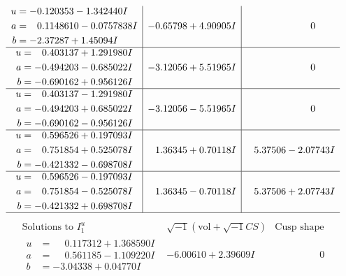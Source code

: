 \documentclass[1p]{elsarticle_modified}
\theoremstyle{definition}
\newcommand{\I}{\sqrt{-1}}
\begin{document}
$$\begin{array}{c|c|c}
\begin{aligned}
u &= -0.120353 - 1.342440 I \\
a &= \phantom{-}0.1148610 - 0.0757838 I \\
b &= -2.37287 + 1.45094 I\end{aligned}
 & -0.65798 + 4.90905 I & \phantom{-0.000000 } 0 \\ \hline\begin{aligned}
u &= \phantom{-}0.403137 + 1.291980 I \\
a &= -0.494203 - 0.685022 I \\
b &= -0.690162 + 0.956126 I\end{aligned}
 & -3.12056 + 5.51965 I & \phantom{-0.000000 } 0 \\ \hline\begin{aligned}
u &= \phantom{-}0.403137 - 1.291980 I \\
a &= -0.494203 + 0.685022 I \\
b &= -0.690162 - 0.956126 I\end{aligned}
 & -3.12056 - 5.51965 I & \phantom{-0.000000 } 0 \\ \hline\begin{aligned}
u &= \phantom{-}0.596526 + 0.197093 I \\
a &= \phantom{-}0.751854 + 0.525078 I \\
b &= -0.421332 - 0.698708 I\end{aligned}
 & \phantom{-}1.36345 + 0.70118 I & \phantom{-}5.37506 - 2.07743 I \\ \hline\begin{aligned}
u &= \phantom{-}0.596526 - 0.197093 I \\
a &= \phantom{-}0.751854 - 0.525078 I \\
b &= -0.421332 + 0.698708 I\end{aligned}
 & \phantom{-}1.36345 - 0.70118 I & \phantom{-}5.37506 + 2.07743 I\\
 \hline 
 \end{array}$$\newpage$$\begin{array}{c|c|c}  
\text{Solutions to }I^u_{1}& \I (\text{vol} + \sqrt{-1}CS) & \text{Cusp shape}\\
 \hline 
\begin{aligned}
u &= \phantom{-}0.117312 + 1.368590 I \\
a &= \phantom{-}0.561185 - 1.109220 I \\
b &= -3.04338 + 0.04770 I\end{aligned}
 & -6.00610 + 2.39609 I & \phantom{-0.000000 } 0 \\ \hline\begin{aligned}

\end{aligned}
\end{array}$$
\end{document}
